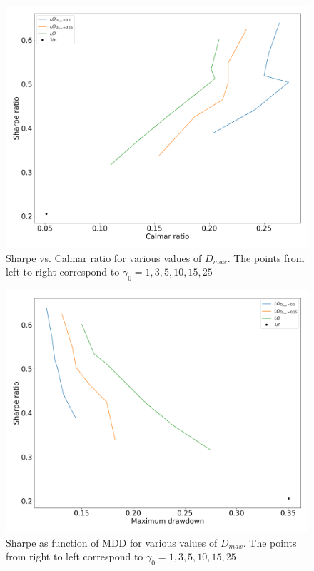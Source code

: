 \begin{figure}[H]
    \centering
    \includegraphics[width=1\textwidth]{analysis/portfolio_exercise/images/mle/sharpe_calmar_lo.png}
    \caption[Sharpe vs. Calmar ratio for various values of $D_{max}$]{Sharpe vs. Calmar ratio for various values of $D_{max}$. The points from left to right correspond to $\gamma_0=1,3,5,10,15,25$}
    \label{fig:MPC_sharpe_calmar_lo}
\end{figure}

\begin{figure}[H]
    \centering
    \includegraphics[width=1\textwidth]{analysis/portfolio_exercise/images/mle/sharpe_mdd_lo.png}
    \caption[Sharpe as function of MDD for various values of $D_{max}$]{Sharpe as function of MDD for various values of $D_{max}$. The points from right to left correspond to $\gamma_0=1,3,5,10,15,25$}
    \label{fig:MPC_sharpe_mdd_lo}
\end{figure}

